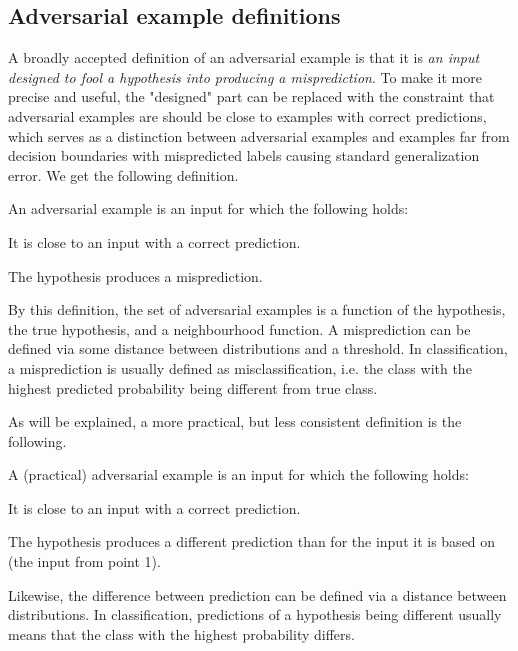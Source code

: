 \documentclass[twocolumn]{article}
\begin{document}
\subsection{Adversarial example definitions} \label{sec:adversarial-example-definitions}
A broadly accepted definition of an adversarial example is that it is \textit{an input designed to fool a hypothesis into producing a misprediction}. To make it more precise and useful, the "designed" part can be replaced with the constraint that adversarial examples are should be close to examples with correct predictions, which serves as a distinction between adversarial examples and examples far from decision boundaries with mispredicted labels causing standard generalization error. We get the following definition.
\begin{definition} \label{def:ae-consistent}
	An adversarial example is an input for which the following holds:
	\begin{solidenumerate}
		\item It is close to an input with a correct prediction.
		\item The hypothesis produces a misprediction.
	\end{solidenumerate}
\end{definition}
By this definition, the set of adversarial examples is a function of the hypothesis, the true hypothesis, and a neighbourhood function. A misprediction can be defined via some distance between distributions and a threshold. In classification, a misprediction is usually defined as misclassification, i.e. the class with the highest predicted probability being different from true class.

As will be explained, a more practical, but less consistent definition is the following. 
\begin{definition} \label{def:ae-practical}
	A (practical) adversarial example is an input for which the following holds:
	\begin{solidenumerate}
		\item It is close to an input with a correct prediction.
		\item The hypothesis produces a different prediction than for the input it is based on (the input from point 1).
	\end{solidenumerate}
\end{definition}
Likewise, the difference between prediction can be defined via a distance between distributions.	
In classification, predictions of a hypothesis being different usually means that the class with the highest probability differs.
\end{document}
